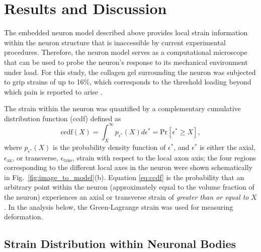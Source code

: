\documentclass[]{interact}
\begin{document}
\section{Results and Discussion}
\label{sec:results}

The embedded neuron model described above provides local strain information within the neuron structure that is inaccessible by current experimental procedures. Therefore, the neuron model serves as a computational microscope that can be used to probe the  neuron's response to its mechanical environment under load. For this study, the collagen gel surrounding the neuron was subjected to grip strains of up to 16$\%$, which corresponds to the threshold loading beyond which pain is reported to arise \citep{Lee:2004jl,Dong:2012bn,Zhang:2016ga,Ita:Ys0ulxs9,Zhang:2017gr}. 

The strain within the neuron was quantified by a complementary cumulative distribution function (ccdf) defined as 
%
\begin{equation}
\text{ccdf}(X) = \int_{X}^{\infty} p_{\epsilon^*}(X)d\epsilon^* = \text{Pr}[ \epsilon^*\ge X],
\label{eq:ccdf}
\end{equation}
%
where $p_{\epsilon^*}(X)$ is the probability density function of $\epsilon^*$, and $\epsilon^*$ is either the axial, $\epsilon_{\text{ax}}$, or transverse, $\epsilon_{\text{trns}}$, strain with respect to the local axon axis; the four regions corresponding to the different local axes in the neuron were shown schematically in Fig.\ \ref{fig:image_to_model}(b). Equation \ref{eq:ccdf} is the probability that an arbitrary point within the neuron (approximately equal to the volume fraction of the neuron) experiences an axial or transverse strain of \textit{greater than or equal to} $X$. In the analysis below, the Green-Lagrange strain was used for measuring deformation. 

\subsection{Strain Distribution within Neuronal Bodies}
\label{subsec:strain_distribution}
\end{document}
